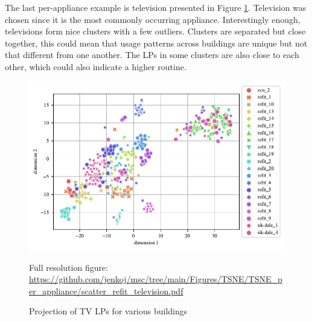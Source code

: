 

The last per-appliance example is television presented in Figure \ref{fig:tsne_pa_scatter_all_tv}. 
Television was chosen since it is the most commonly occurring appliance.
Interestingly enough, televisions form nice clusters with a few outliers.
Clusters are separated but close together, this could mean that usage patterns across buildings are unique
but not that different from one another. 
The LPs in some clusters are also close to each other, which could also indicate 
a higher routine.

\begin{figure}[H]
	\centering
	\caption{Projection of TV LPs for various buildings}
	\includegraphics[]{Figures/TSNE/TSNE_per_appliance/scatter_refit_television.pdf}
	\label{fig:tsne_pa_scatter_all_tv}
	\par
	\par\footnotesize{Full resolution figure: \url{https://github.com/jenkoj/msc/tree/main/Figures/TSNE/TSNE_per_appliance/scatter_refit_television.pdf}}
\end{figure}


